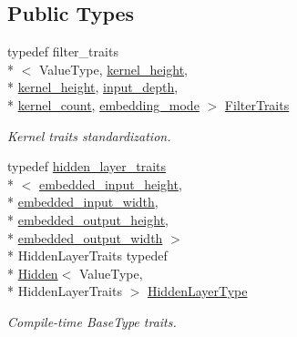 \subsection*{Public Types}
\begin{DoxyCompactItemize}
\item 
typedef filter\-\_\-traits\\*
$<$ Value\-Type, \hyperlink{structffnn_1_1layer_1_1convolution__layer__traits_ad6fb939fee90c196d31a8c98f663caa3}{kernel\-\_\-height}, \\*
\hyperlink{structffnn_1_1layer_1_1convolution__layer__traits_ad6fb939fee90c196d31a8c98f663caa3}{kernel\-\_\-height}, \hyperlink{structffnn_1_1layer_1_1convolution__layer__traits_a508a1594a6f77f6f536744cd40e2b9fd}{input\-\_\-depth}, \\*
\hyperlink{structffnn_1_1layer_1_1convolution__layer__traits_a4cdb0a6a0f47662f59f77beff2b406e5}{kernel\-\_\-count}, \hyperlink{structffnn_1_1layer_1_1convolution__layer__traits_ab598247847360cd7a710c9b0b14496ae}{embedding\-\_\-mode} $>$ \hyperlink{structffnn_1_1layer_1_1convolution__layer__traits_acea1d4d335c6bfe4151ac326f1a341de}{Filter\-Traits}
\begin{DoxyCompactList}\small\item\em Kernel traits standardization. \end{DoxyCompactList}\item 
typedef \hyperlink{structffnn_1_1layer_1_1hidden__layer__traits}{hidden\-\_\-layer\-\_\-traits}\\*
$<$ \hyperlink{structffnn_1_1layer_1_1convolution__layer__traits_a749c38192fa7552eb5cd5ebc4b564592}{embedded\-\_\-input\-\_\-height}, \\*
\hyperlink{structffnn_1_1layer_1_1convolution__layer__traits_ae43600771fd374186af19f38dd2805bf}{embedded\-\_\-input\-\_\-width}, \\*
\hyperlink{structffnn_1_1layer_1_1convolution__layer__traits_a00abec5f1e390a13ce4fc9daf67e5ca7}{embedded\-\_\-output\-\_\-height}, \\*
\hyperlink{structffnn_1_1layer_1_1convolution__layer__traits_a34a2b3bbb6a24b89d48554b7c56d9654}{embedded\-\_\-output\-\_\-width} $>$\\*
 Hidden\-Layer\-Traits typedef \\*
\hyperlink{classffnn_1_1layer_1_1_hidden}{Hidden}$<$ Value\-Type, \\*
Hidden\-Layer\-Traits $>$ \hyperlink{structffnn_1_1layer_1_1convolution__layer__traits_a53bf482ee85839d3c314180598c931b4}{Hidden\-Layer\-Type}
\begin{DoxyCompactList}\small\item\em Compile-\/time Base\-Type traits. \end{DoxyCompactList}\end{DoxyCompactItemize}
